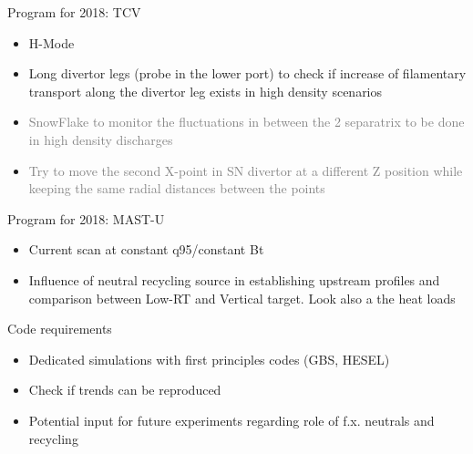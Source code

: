 \documentclass[10pt, compress]{beamer}
\begin{document}
\begin{frame}{Program for 2018: TCV}
  \begin{itemize}
     \item \textcolor{consorziored}{H-Mode} 
      \item \textcolor{ta2orange}{Long divertor legs (probe in the lower port) to check if
        increase of filamentary transport along the divertor leg
        exists in high density scenarios}
      \item \textcolor{gray}{SnowFlake to monitor the fluctuations in between the 2 separatrix
	to be done in high density discharges}
       \item \textcolor{gray}{Try to move the second X-point in SN divertor at a different
	Z position while keeping the same radial distances between the
	points}
\end{itemize}
\end{frame}

\begin{frame}{Program for 2018: MAST-U}
  \begin{itemize}
      \item Current scan at constant q95/constant Bt
      \item Influence of neutral recycling source in establishing upstream profiles
	and comparison between Low-RT and Vertical target. Look also a
        the heat loads
      \end{itemize}
\end{frame}

\begin{frame}{Code requirements}
  \begin{itemize}
    \item Dedicated simulations with first principles codes (GBS,
      HESEL)
    \item Check if trends can be reproduced
    \item Potential input for future experiments regarding role of
        f.x. neutrals and recycling
  \end{itemize}
\end{frame}
\end{document}
